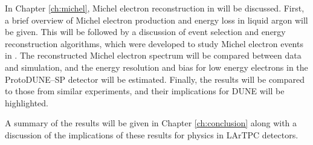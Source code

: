 In Chapter \ref{ch:michel}, Michel electron reconstruction in \protodune{} will
be discussed. First, a brief overview of Michel electron production and energy 
loss in liquid argon will be given. This will be followed by a discussion of 
event selection and energy reconstruction algorithms, which were developed to 
study Michel electron events in \protodune{}. The reconstructed Michel electron 
spectrum will be compared between data and simulation, and the energy resolution
and bias for low energy electrons in the ProtoDUNE--SP detector will be 
estimated. Finally, the results will be compared to those from similar 
experiments, and their implications for DUNE will be highlighted.

A summary of the results will be given in Chapter \ref{ch:conclusion} along 
with a discussion of the implications of these results for physics in LArTPC 
detectors.
